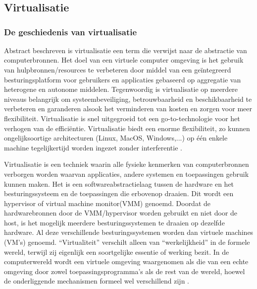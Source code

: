 \chapter{}
\label{ch:stand-van-zaken}

\section{Virtualisatie}
\subsection{De geschiedenis van virtualisatie}

Abstract beschreven is virtualisatie een term die verwijst naar de abstractie van computerbronnen. Het doel van een virtuele computer omgeving is het gebruik van hulpbronnen/resources te verbeteren door middel van een geïntegreerd besturingsplatform voor gebruikers en applicaties gebaseerd op aggregatie van heterogene en autonome middelen. Tegenwoordig is virtualisatie op meerdere niveaus belangrijk om systeembeveiliging, betrouwbaarheid en beschikbaarheid te verbeteren en garanderen alsook het verminderen van kosten en zorgen voor meer flexibiliteit. Virtualisatie is snel uitgegroeid tot een go-to-technologie voor het verhogen van de efficiëntie. Virtualisatie biedt een enorme flexibiliteit, zo kunnen ongelijksoortige architecturen (Linux, MacOS, Windows,...) op één enkele machine tegelijkertijd worden ingezet zonder interferentie \autocite{Ameen2013}.

Virtualisatie is een techniek waarin alle fysieke kenmerken van computerbronnen verborgen worden waarvan applicaties, andere systemen en toepassingen gebruik kunnen maken. Het is een softwareabstractielaag tussen de hardware en het besturingssysteem en de toepassingen die erbovenop draaien. Dit wordt een hypervisor of virtual machine monitor(VMM) genoemd. Doordat de hardwarebronnen door de VMM/hypervisor worden gebruikt en niet door de host, is het mogelijk meerdere besturingssystemen te draaien op dezelfde hardware. Al deze verschillende besturingssystemen worden dan virtuele machines (VM's) genoemd. “Virtualiteit” verschilt alleen van “werkelijkheid” in de formele wereld, terwijl zij eigenlijk een soortgelijke essentie of werking bezit. In de computerwereld wordt een virtuele omgeving waargenomen als die van een echte omgeving door zowel toepassingsprogramma's als de rest van de wereld, hoewel de onderliggende mechanismen formeel wel verschillend zijn \autocite{Ameen2013}.


